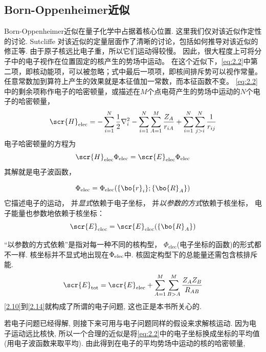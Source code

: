 \subsection{Born-Oppenheimer近似}
\label{sec2.1.2}
Born-Oppenheimer近似在量子化学中占据着核心位置.
这里我们仅对该近似作定性的讨论. Sutcliffe
对该近似的定量层面作了清晰的讨论，包括如何推导对该近似的修正等. 
由于原子核远比电子重，所以它们运动得较慢。
因此，很大程度上可将分子中的电子视作在位置固定的核产生的势场中运动。
在这个近似下，\autoref{eq:2.2}中第二项，即核动能项，可以被忽略；式中最后一项项，即核间排斥势可以视作常量。
任意常数加到算符上产生的效果就是本征值加一常数，而本征函数不变。
\autoref{eq:2.2}中的剩余项称作电子的哈密顿量，或描述在$M$个点电荷产生的势场中运动的$N$个电子的哈密顿量，
\begin{equation}
\label{2.10}
\scr{H}_{\rm elec}=-\sum_{i=1}^{N}\frac{1}{2}\nabla_i^2 - \sum_{i=1}^{N}\sum_{A=1}^{M}\frac{Z_A}{r_{iA}} + \sum_{i=1}^{N}\sum_{j>i}^{N}\frac{1}{r_{ij}}
\end{equation}
电子哈密顿量的\sch 方程为
\begin{equation}
\label{2.11}
\scr{H}_{\rm elec}\Phi_{\rm elec}=\scr{E}_{\rm elec}\Phi_{\rm elec}
\end{equation}
其解就是电子波函数，

\begin{equation}
\label{2.12}
\Phi_{\rm elec}=\Phi_{\rm elec}(\{\bo{r}_i\};\{\bo{R}_A\})
\end{equation}
它描述电子的运动，
并\emph{显式}依赖于电子坐标，
并\emph{以参数的方式}依赖于核坐标，
电子能量也参数地依赖于核坐标：
\begin{equation}
\label{2.13}
\scr{E}_{\rm elec}=\scr{E}_{\rm elec}(\{\bo{R}_A\})
\end{equation}

“以参数的方式依赖”是指对每一种不同的核构型，
$\Phi_\mathrm{elec}$(电子坐标的函数)的形式都不一样. 
核坐标并不显式地出现在$\Phi_{\rm elec}$中. 
核固定构型下的总能量还需包含核排斥能.
\begin{equation}
\label{2.14}
\scr{E}_{\rm tot}=\scr{E}_{\rm elec}+\sum_{A=1}^{M}\sum_{B>A}^M\frac{Z_AZ_B}{R_{AB}}
\end{equation}
\autoref{2.10}到\autoref{2.14}就构成了所谓的电子问题, 
这也正是本书所关心的.


若电子问题已经得解, 
则接下来可用与电子问题同样的假设来求解核运动. 
因为电子运动远比核快, 
所以一个合理的近似是将\autoref{eq:2.2}中的电子坐标换成坐标的平均值(用电子波函数来取平均). 
由此得到在电子的平均势场中运动的核的哈密顿量,

